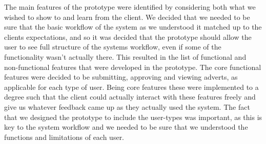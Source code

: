 The main features of the prototype were identified by considering both what we wished to show to
and learn from the client. We decided that we needed to be sure that the basic workflow of the system 
as we understood it matched up to the clients expectations, and so it was decided that the prototype should
allow the user to see full structure of the systems workflow, even if some of the functionality wasn't actually 
there. This resulted in the list of functional and non-functional features that were developed in the prototype.
The core functional features were decided to be submitting, approving and viewing adverts, as applicable for 
each type of user. Being core features these were implemented to a degree such that the client could actually
interact with these features freely and give us whatever feedback came up as they actually used the system. 
The fact that we designed the prototype to include the user-types was important, as this is key to the system 
workflow and we needed to be sure that we understood the functions and limitations of each user.